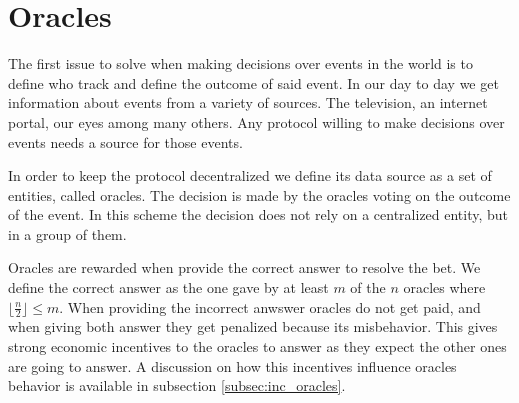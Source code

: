 \section{Oracles}

The first issue to solve when making decisions over events in the world is to
  define who track and define the outcome of said event.
In our day to day we get information about events from a variety of sources. The
  television, an internet portal, our eyes among many others. Any protocol
  willing to make decisions over events needs a source for those events.

In order to keep the protocol decentralized we define its data source as a set
  of entities, called oracles. The decision is made by the oracles voting on
  the outcome of the event. In this scheme the decision does not rely on a
  centralized entity, but in a group of them.

Oracles are rewarded when provide the correct answer to resolve the bet.
We define the correct answer as the one gave by at least $m$ of the $n$ oracles
  where $\lfloor \frac{n}{2} \rfloor \leq m$.
When providing the incorrect anwswer oracles do not get paid, and when giving
  both answer they get penalized because its misbehavior. This gives strong
  economic incentives to the oracles to answer as they expect the other ones
  are going to answer.
A discussion on how this incentives influence oracles behavior is available
  in subsection \ref{subsec:inc_oracles}.

